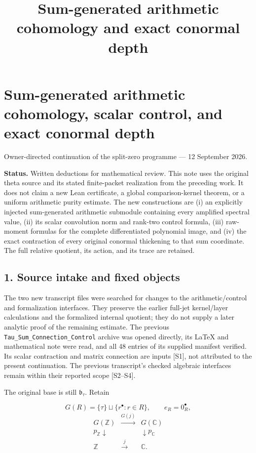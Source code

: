 \documentclass[
]{article}
\title{Sum-generated arithmetic cohomology and exact conormal depth}
\author{}
\date{}
\begin{document}
\maketitle

\section{Sum-generated arithmetic cohomology, scalar control, and exact
conormal
depth}\label{sum-generated-arithmetic-cohomology-scalar-control-and-exact-conormal-depth}

Owner-directed continuation of the split-zero programme --- 12 September
2026.

\textbf{Status.} Written deductions for mathematical review. This note
uses the original theta source and its stated finite-packet realization
from the preceding work. It does not claim a new Lean certificate, a
global comparison-kernel theorem, or a uniform arithmetic purity
estimate. The new constructions are (i) an explicitly injected
sum-generated arithmetic submodule containing every amplified spectral
value, (ii) its scalar convolution norm and rank-two control formula,
(iii) raw-moment formulas for the complete differentiated polynomial
image, and (iv) the exact contraction of every original conormal
thickening to that sum coordinate. The full relative quotient, its
action, and its trace are retained.

\subsection{1. Source intake and fixed
objects}\label{source-intake-and-fixed-objects}

The two new transcript files were searched for changes to the
arithmetic/control and formalization interfaces. They preserve the
earlier full-jet kernel/layer calculations and the formalized internal
quotient; they do not supply a later analytic proof of the remaining
estimate. The previous \texttt{Tau\_Sum\_Connection\_Control} archive
was opened directly, its LaTeX and mathematical note were read, and all
48 entries of its supplied manifest verified. Its scalar contraction and
matrix connection are inputs {[}S1{]}, not attributed to the present
continuation. The previous transcript's checked algebraic interfaces
remain within their reported scope {[}S2--S4{]}.

The original base is still \(\mathfrak b_\tau\). Retain

\[G(R)=\{\tau\}\sqcup\{r^\bullet:r\in R\},\qquad e_R=0_R^\bullet,\]
\[\begin{array}{ccc}
G(\mathbb Z)&\xrightarrow{G(j)}&G(\mathbb C)\\
p_{\mathbb Z}\downarrow&&\downarrow p_{\mathbb C}\\
\mathbb Z&\xrightarrow{j}&\mathbb C .
\end{array}\tag{1.1}\]
\end{document}
